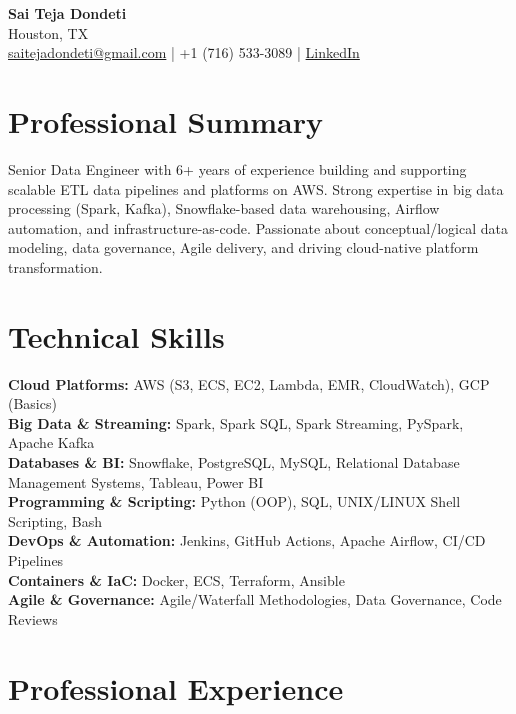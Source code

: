 \documentclass[10pt]{article} %
\begin{document}
\begin{center}
    {\LARGE \textbf{Sai Teja Dondeti}} \\
    \vspace{2pt}
    Houston, TX \\
    \href{mailto:saitejadondeti@gmail.com}{saitejadondeti@gmail.com} \;|\;
    +1 (716) 533-3089 \;|\; %
    \href{https://www.linkedin.com/in/sai-teja-dondeti/}{LinkedIn}
\end{center}

\section*{Professional Summary}
Senior Data Engineer with 6+ years of experience building and supporting scalable ETL data pipelines and platforms on AWS. %
Strong expertise in big data processing (Spark, Kafka), Snowflake-based data warehousing, Airflow automation, and infrastructure-as-code. %
Passionate about conceptual/logical data modeling, data governance, Agile delivery, and driving cloud-native platform transformation. %

\section*{Technical Skills}

\textbf{Cloud Platforms:} AWS (S3, ECS, EC2, Lambda, EMR, CloudWatch), GCP (Basics) \\ %
\textbf{Big Data \& Streaming:} Spark, Spark SQL, Spark Streaming, PySpark, Apache Kafka \\
\textbf{Databases \& BI:} Snowflake, PostgreSQL, MySQL, Relational Database Management Systems, Tableau, Power BI \\ %
\textbf{Programming \& Scripting:} Python (OOP), SQL, UNIX/LINUX Shell Scripting, Bash \\ %
\textbf{DevOps \& Automation:} Jenkins, GitHub Actions, Apache Airflow, CI/CD Pipelines \\ %
\textbf{Containers \& IaC:} Docker, ECS, Terraform, Ansible \\ %
\textbf{Agile \& Governance:} Agile/Waterfall Methodologies, Data Governance, Code Reviews %

\section*{Professional Experience}
\end{document}
